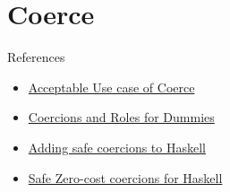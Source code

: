 \chapter{Coerce}

References

\begin{itemize}
    \item \href{https://www.reddit.com/r/haskell/comments/3uvyed/acceptable_use_cases_of_coerce/}{Acceptable Use case of Coerce}
    \item \href{https://reasonablypolymorphic.com/blog/roles/}{Coercions and Roles for Dummies}
    \item \href{https://www.joachim-breitner.de/blog/610-Adding_safe_coercions_to_Haskell}{Adding safe coercions to Haskell}
    \item \href{https://www.microsoft.com/en-us/research/wp-content/uploads/2016/07/coercible.pdf}{Safe Zero-cost coercions for Haskell}
\end{itemize}
